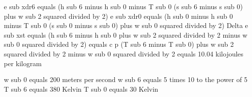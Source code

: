 e sub xdr6 equals (h sub 6 minus h sub 0 minus T sub 0 (s sub 6 minus s sub 0) plus w sub 2 squared divided by 2)
e sub xdr0 equals (h sub 0 minus h sub 0 minus T sub 0 (s sub 0 minus s sub 0) plus w sub 0 squared divided by 2)
Delta e sub xst equals (h sub 6 minus h sub 0 plus w sub 2 squared divided by 2 minus w sub 0 squared divided by 2) equals c p (T sub 6 minus T sub 0) plus w sub 2 squared divided by 2 minus w sub 0 squared divided by 2 equals 10.04 kilojoules per kilogram

w sub 0 equals 200 meters per second
w sub 6 equals 5 times 10 to the power of 5
T sub 6 equals 380 Kelvin
T sub 0 equals 30 Kelvin